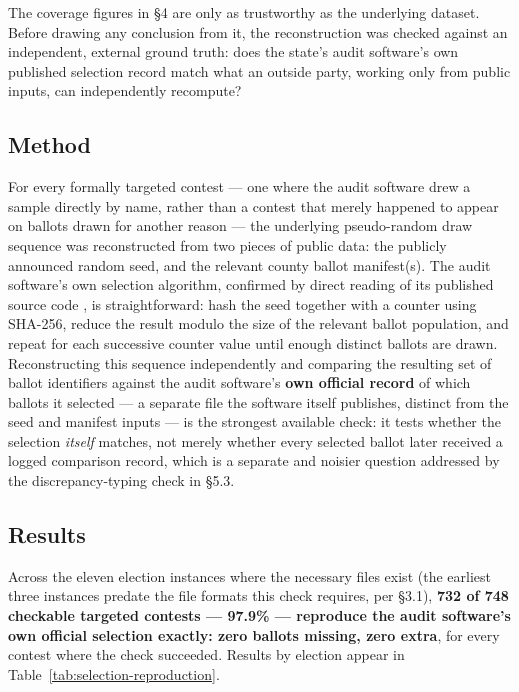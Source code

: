 The coverage figures in §4 are only as trustworthy as the underlying
dataset. Before drawing any conclusion from it, the reconstruction was
checked against an independent, external ground truth: does the state's
audit software's own published selection record match what an outside
party, working only from public inputs, can independently recompute?

\subsection{Method}

For every formally targeted contest — one where the audit software drew a
sample directly by name, rather than a contest that merely happened to
appear on ballots drawn for another reason — the underlying pseudo-random
draw sequence was reconstructed from two pieces of public data: the
publicly announced random seed, and the relevant county ballot manifest(s).
The audit software's own selection algorithm, confirmed by direct reading
of its published source code \cite{corlasoftware}, is straightforward: hash the seed together
with a counter using SHA-256, reduce the result modulo the size of the
relevant ballot population, and repeat for each successive counter value
until enough distinct ballots are drawn. Reconstructing this sequence
independently and comparing the resulting set of ballot identifiers against
the audit software's \textbf{own official record} of which ballots it selected
— a separate file the software itself publishes, distinct from the seed and
manifest inputs — is the strongest available check: it tests whether the
selection \textit{itself} matches, not merely whether every selected ballot later
received a logged comparison record, which is a separate and noisier
question addressed by the discrepancy-typing check in §5.3.

\subsection{Results}

Across the eleven election instances where the necessary files exist (the
earliest three instances predate the file formats this check requires, per
§3.1), \textbf{732 of 748 checkable targeted contests — 97.9\% — reproduce the
audit software's own official selection exactly: zero ballots missing, zero
extra}, for every contest where the check succeeded. Results by election
appear in Table~\ref{tab:selection-reproduction}.

